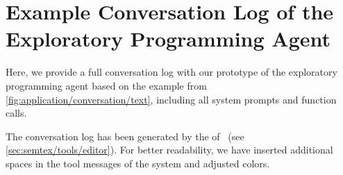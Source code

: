 
\chapter{Example Conversation Log of the Exploratory Programming Agent}
\label{apx:conversation}

Here, we provide a full conversation log with our prototype of the exploratory programming agent based on the example from \cref{fig:application/conversation/text}, including all system prompts and function calls.

The conversation log has been generated by the  of \semtex~(see \cref{sec:semtex/tools/editor}).
For better readability, we have inserted additional spaces in the tool messages of the system and adjusted colors.

\begin{raggedright}
\textsf{%
%
}
\end{raggedright}

